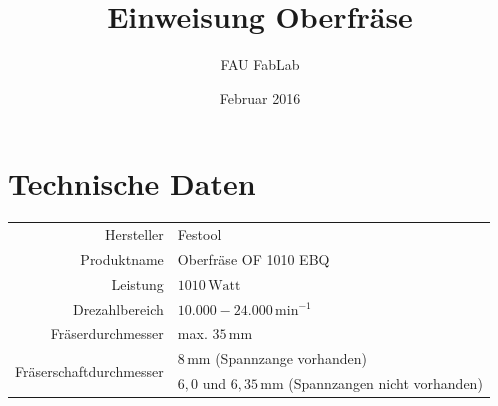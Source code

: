 \documentclass{\basedir/fablab-document}
\date{Februar 2016}
\author{FAU FabLab} %
\title{Einweisung Oberfräse}
\begin{document}
\dosecttoc
\faketableofcontents
{}


\section{Technische Daten}
\begin{tabular}{r|l}
Hersteller & Festool \\
Produktname & Oberfräse OF 1010 EBQ \\
Leistung & $1010\,\mathrm{Watt}$ \\
Drezahlbereich & $10.000 - 24.000\,\mathrm{min}^{-1}$ \\
Fräserdurchmesser & max. $35\,\mathrm{mm}$ \\
\multirow{2}{*}{Fräserschaftdurchmesser} & $8\,\mathrm{mm}$ (Spannzange vorhanden)\\
                        & $6,0$ und $6,35\,\mathrm{mm}$ (Spannzangen nicht vorhanden) \\
\end{tabular}
\end{document}

